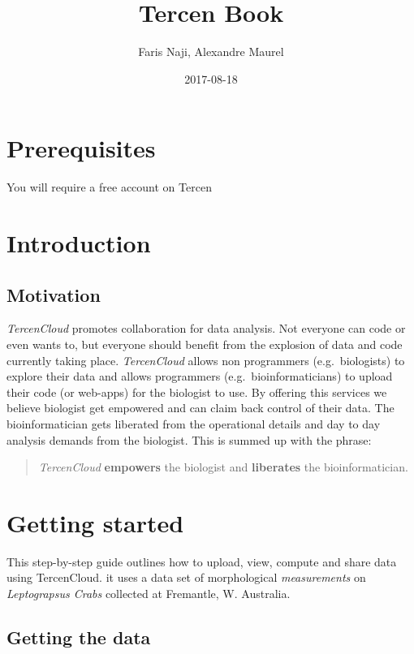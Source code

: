 \documentclass[]{book}
\title{Tercen Book}
\author{Faris Naji, Alexandre Maurel}
\date{2017-08-18}
\theoremstyle{definition}
\theoremstyle{definition}
\theoremstyle{remark}
\begin{document}
\maketitle

{
\setcounter{tocdepth}{1}
\tableofcontents
}
\chapter{Prerequisites}\label{prerequisites}

You will require a free account on Tercen

\chapter{Introduction}\label{intro}

\section{Motivation}\label{motivation}

\emph{TercenCloud} promotes collaboration for data analysis. Not
everyone can code or even wants to, but everyone should benefit from the
explosion of data and code currently taking place. \emph{TercenCloud}
allows non programmers (e.g.~biologists) to explore their data and
allows programmers (e.g.~bioinformaticians) to upload their code (or
web-apps) for the biologist to use. By offering this services we believe
biologist get empowered and can claim back control of their data. The
bioinformatician gets liberated from the operational details and day to
day analysis demands from the biologist. This is summed up with the
phrase:

\begin{quote}
\emph{TercenCloud} \textbf{empowers} the biologist and
\textbf{liberates} the bioinformatician.
\end{quote}

\chapter{Getting started}\label{getting-started}

This step-by-step guide outlines how to upload, view, compute and share
data using TercenCloud. it uses a data set of morphological
\emph{measurements} on \emph{Leptograpsus Crabs} collected at Fremantle,
W. Australia.

\section{Getting the data}\label{getting-the-data}
\end{document}
